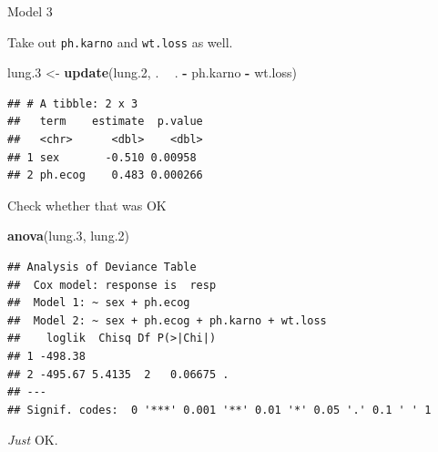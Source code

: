 \documentclass[ignorenonframetext,]{beamer}
\newenvironment{Shaded}{\begin{snugshade}}{\end{snugshade}}
\newcommand{\FloatTok}[1]{\textcolor[rgb]{0.00,0.00,0.81}{#1}}
\newcommand{\KeywordTok}[1]{\textcolor[rgb]{0.13,0.29,0.53}{\textbf{#1}}}
\newcommand{\NormalTok}[1]{#1}
\newcommand{\OperatorTok}[1]{\textcolor[rgb]{0.81,0.36,0.00}{\textbf{#1}}}
\newcommand{\StringTok}[1]{\textcolor[rgb]{0.31,0.60,0.02}{#1}}
\begin{document}
\begin{frame}[fragile]{Model 3}
\protect\hypertarget{model-3}{}

Take out \texttt{ph.karno} and \texttt{wt.loss} as well.

\begin{Shaded}
\begin{Highlighting}[]
\NormalTok{lung}\FloatTok{.3}\NormalTok{ <-}\StringTok{ }\KeywordTok{update}\NormalTok{(lung}\FloatTok{.2}\NormalTok{, . }\OperatorTok{~}\StringTok{ }\NormalTok{. }\OperatorTok{-}\StringTok{ }\NormalTok{ph.karno }\OperatorTok{-}\StringTok{ }\NormalTok{wt.loss)}
\end{Highlighting}
\end{Shaded}

\begin{Shaded}
\end{Shaded}

\begin{verbatim}
## # A tibble: 2 x 3
##   term    estimate  p.value
##   <chr>      <dbl>    <dbl>
## 1 sex       -0.510 0.00958 
## 2 ph.ecog    0.483 0.000266
\end{verbatim}

\end{frame}

\begin{frame}[fragile]{Check whether that was OK}
\protect\hypertarget{check-whether-that-was-ok}{}

\begin{Shaded}
\begin{Highlighting}[]
\KeywordTok{anova}\NormalTok{(lung}\FloatTok{.3}\NormalTok{, lung}\FloatTok{.2}\NormalTok{)}
\end{Highlighting}
\end{Shaded}

\begin{verbatim}
## Analysis of Deviance Table
##  Cox model: response is  resp
##  Model 1: ~ sex + ph.ecog
##  Model 2: ~ sex + ph.ecog + ph.karno + wt.loss
##    loglik  Chisq Df P(>|Chi|)  
## 1 -498.38                      
## 2 -495.67 5.4135  2   0.06675 .
## ---
## Signif. codes:  0 '***' 0.001 '**' 0.01 '*' 0.05 '.' 0.1 ' ' 1
\end{verbatim}

\emph{Just} OK.

\end{frame}
\end{document}
